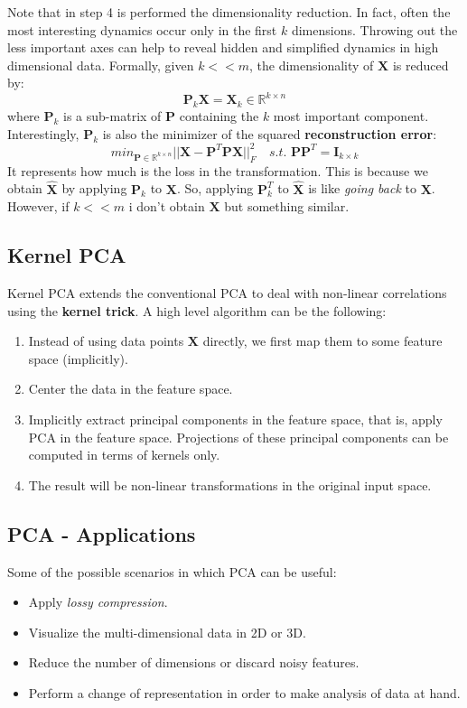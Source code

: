 Note that in step 4 is performed the dimensionality reduction. In fact, often the most interesting dynamics occur only in the first $k$ dimensions. Throwing out the less important axes can help to reveal hidden and simplified dynamics in high dimensional data.\newline\newline
Formally, given $k << m$, the dimensionality of $\textbf{X}$ is reduced by:
\[\textbf{P}_{k}\textbf{X} = \textbf{X}_{k} \in \mathbb{R}^{k \times n}\]
where $\textbf{P}_{k}$ is a sub-matrix of $\textbf{P}$ containing the $k$ most important component.\newline\newline
Interestingly, $\textbf{P}_{k}$ is also the minimizer of the squared \textbf{reconstruction error}:
\[min_{\textbf{P} \in \mathbb{R}^{k \times n}} ||\textbf{X} - \textbf{P}^{T}\textbf{P}\textbf{X}||^{2}_{F} \quad s.t. \,\, \textbf{P}\textbf{P}^{T} = \textbf{I}_{k \times k}\]
It represents how much is the loss in the transformation. This is because we obtain $\hat{\textbf{X}}$ by applying $\textbf{P}_{k}$ to $\textbf{X}$. So, applying $\textbf{P}_{k}^{T}$ to $\hat{\textbf{X}}$ is like \textit{going back} to $\textbf{X}$. However, if $k << m$ i don't obtain $\textbf{X}$ but something similar.

\subsection{Kernel PCA}
Kernel PCA extends the conventional PCA to deal with non-linear correlations using the \textbf{kernel trick}. A high level algorithm can be the following:
\begin{enumerate}
    \item Instead of using data points $\textbf{X}$ directly, we first map them to some feature space (implicitly).

    \item Center the data in the feature space.

    \item Implicitly extract principal components in the feature space, that is, apply PCA in the feature space. Projections of these principal components can be computed in terms of kernels only.

    \item The result will be non-linear transformations in the original input space.
\end{enumerate}

\subsection{PCA - Applications}
Some of the possible scenarios in which PCA can be useful:
\begin{itemize}
    \item Apply \textit{lossy compression}.
    \item Visualize the multi-dimensional data in 2D or 3D.
    \item Reduce the number of dimensions or discard noisy features.
    \item Perform a change of representation in order to make analysis of data at hand.
\end{itemize}

